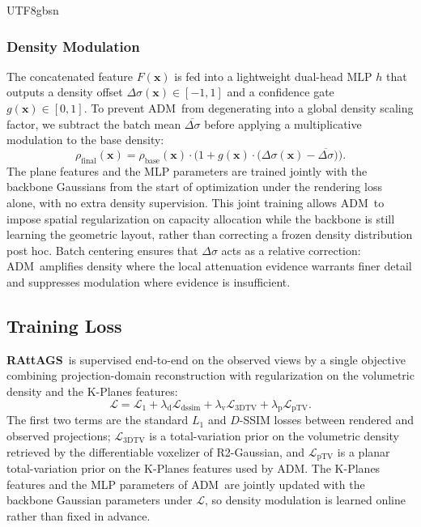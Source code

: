 \documentclass{egpubl}
\newcommand{\traceplain}{RAttAGS}
\newcommand{\RAttAGS}{\textbf{\traceplain}}
\newcommand{\adm}{ADM}
\newcommand{\rtwo}{R2-Gaussian}
\begin{document}
\begin{CJK*}{UTF8}{gbsn}
\subsubsection{Density Modulation}
The concatenated feature $F(\mathbf{x})$ is fed into a lightweight dual-head MLP $h$ that outputs a density offset $\Delta\sigma(\mathbf{x})\!\in\![-1,1]$ and a confidence gate $g(\mathbf{x})\!\in\![0,1]$. To prevent \adm\ from degenerating into a global density scaling factor, we subtract the batch mean $\overline{\Delta\sigma}$ before applying a multiplicative modulation to the base density:
\begin{equation}
\rho_{\text{final}}(\mathbf{x})=\rho_{\text{base}}(\mathbf{x})\cdot\Big(1+g(\mathbf{x})\cdot\big(\Delta\sigma(\mathbf{x})-\overline{\Delta\sigma}\big)\Big).
\label{eq:adm-density}
\end{equation}
The plane features and the MLP parameters are trained jointly with the backbone Gaussians from the start of optimization under the rendering loss alone, with no extra density supervision. This joint training allows \adm\ to impose spatial regularization on capacity allocation while the backbone is still learning the geometric layout, rather than correcting a frozen density distribution post hoc. Batch centering ensures that $\Delta\sigma$ acts as a relative correction: \adm\ amplifies density where the local attenuation evidence warrants finer detail and suppresses modulation where evidence is insufficient.

\subsection{Training Loss}
\label{sec:loss}

\RAttAGS\ is supervised end-to-end on the observed views by a single objective combining projection-domain reconstruction with regularization on the volumetric density and the K-Planes features:
\begin{equation}
\mathcal{L}=\mathcal{L}_{1}+\lambda_{\text{d}}\mathcal{L}_{\text{dssim}}+\lambda_{\text{v}}\mathcal{L}_{\text{3DTV}}+\lambda_{\text{p}}\mathcal{L}_{\text{pTV}}.
\label{eq:training-loss}
\end{equation}
The first two terms are the standard $L_1$ and $D$-SSIM losses between rendered and observed projections; $\mathcal{L}_{\text{3DTV}}$ is a total-variation prior on the volumetric density retrieved by the differentiable voxelizer of \rtwo, and $\mathcal{L}_{\text{pTV}}$ is a planar total-variation prior on the K-Planes features used by \adm. The K-Planes features and the MLP parameters of \adm\ are jointly updated with the backbone Gaussian parameters under $\mathcal{L}$, so density modulation is learned online rather than fixed in advance.


\end{CJK*}
\end{document}
